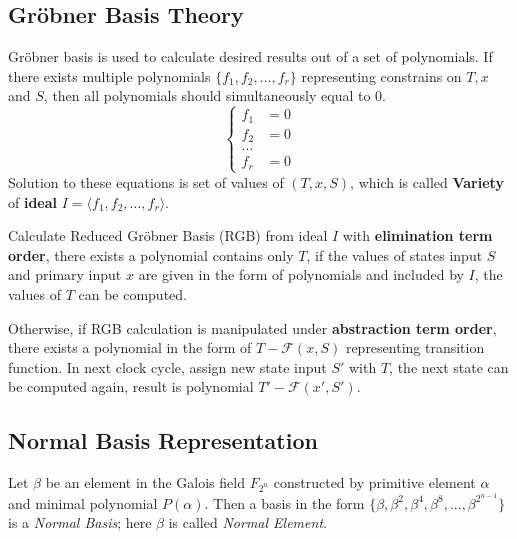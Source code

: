 \subsection{Gr\"obner Basis Theory}
Gr\"obner basis is used to calculate desired results out of a set of polynomials.
If there exists multiple polynomials $\{f_1, f_2, \dots, f_r\}$ representing constrains on $T, x$ and $S$,
then all polynomials should simultaneously equal to $0$.
\begin{displaymath}
\left\{
  \begin{array}{lc}
  f_1 & = 0\\
  f_2 & = 0\\
  \dots & \ \\
  f_r & = 0
  \end{array} \right.
\end{displaymath}
Solution to these equations is set of values of $(T, x, S)$, which is called \textbf{Variety} of \textbf{ideal}
$I = \langle f_1, f_2, \dots, f_r\rangle $.

Calculate Reduced Gr\"obner Basis (RGB) from ideal $I$ with \textbf{elimination term order}, there exists a polynomial contains
only $T$, if the values of states input $S$ and primary input $x$ are given in the form of polynomials and included by $I$,
the values of $T$ can be computed.

Otherwise, if RGB calculation is manipulated under \textbf{abstraction term order}, there exists a polynomial in
the form of $T - \mathcal{F}(x, S)$ representing transition function. In next clock cycle, assign new state input $S'$ with $T$, the next
state can be computed again, result is polynomial $T' - \mathcal{F}(x', S')$. 

\subsection{Normal Basis Representation}

Let $\beta$ be an element in the Galois field $F_{2^n}$ constructed by primitive element $\alpha$ and minimal polynomial
$P(\alpha)$. Then a basis in the form $\{\beta, \beta^2, \beta^4, \beta^8, ... ,\beta^{2^{n-1}}\}$ is a
\emph{Normal Basis}; here $\beta$ is called \emph{Normal Element}.


